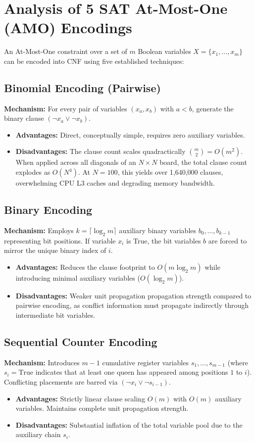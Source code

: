 \documentclass[a4paper,11pt]{article}
\begin{document}
\section{Analysis of 5 SAT At-Most-One (AMO) Encodings}

An At-Most-One constraint over a set of $m$ Boolean variables $X = \{x_1, \dots, x_m\}$ can be encoded into CNF using five established techniques:

\subsection{Binomial Encoding (Pairwise)}
\textbf{Mechanism:} For every pair of variables $(x_a, x_b)$ with $a < b$, generate the binary clause $(\neg x_a \lor \neg x_b)$.
\begin{itemize}
    \item \textbf{Advantages:} Direct, conceptually simple, requires zero auxiliary variables.
    \item \textbf{Disadvantages:} The clause count scales quadractically $\binom{m}{2} = O(m^2)$. When applied across all diagonals of an $N \times N$ board, the total clause count explodes as $O(N^4)$. At $N=100$, this yields over 1,640,000 clauses, overwhelming CPU L3 caches and degrading memory bandwidth.
\end{itemize}

\subsection{Binary Encoding}
\textbf{Mechanism:} Employs $k = \lceil \log_2 m \rceil$ auxiliary binary variables $b_0, \dots, b_{k-1}$ representing bit positions. If variable $x_i$ is True, the bit variables $b$ are forced to mirror the unique binary index of $i$.
\begin{itemize}
    \item \textbf{Advantages:} Reduces the clause footprint to $O(m \log_2 m)$ while introducing minimal auxiliary variables ($O(\log_2 m)$).
    \item \textbf{Disadvantages:} Weaker unit propagation propagation strength compared to pairwise encoding, as conflict information must propagate indirectly through intermediate bit variables.
\end{itemize}

\subsection{Sequential Counter Encoding}
\textbf{Mechanism:} Introduces $m-1$ cumulative register variables $s_1, \dots, s_{m-1}$ (where $s_i = \text{True}$ indicates that at least one queen has appeared among positions $1$ to $i$). Conflicting placements are barred via $(\neg x_i \lor \neg s_{i-1})$.
\begin{itemize}
    \item \textbf{Advantages:} Strictly linear clause scaling $O(m)$ with $O(m)$ auxiliary variables. Maintains complete unit propagation strength.
    \item \textbf{Disadvantages:} Substantial inflation of the total variable pool due to the auxiliary chain $s_i$.
\end{itemize}
\end{document}

